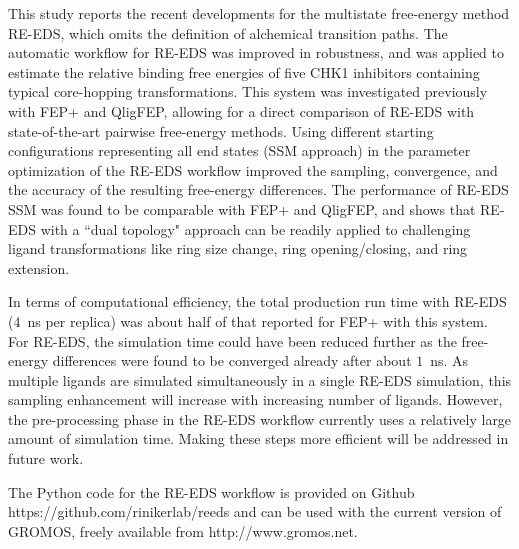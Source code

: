 This study reports the recent developments for the multistate free-energy method RE-EDS, which omits the definition of alchemical transition paths. The automatic workflow for RE-EDS was improved in robustness, and was applied to estimate the relative binding free energies of five CHK1 inhibitors containing typical core-hopping transformations. This system was investigated previously with FEP+ and QligFEP, allowing for a direct comparison of RE-EDS with state-of-the-art pairwise free-energy methods.
Using different starting configurations representing all end states (SSM approach) in the parameter optimization of the RE-EDS workflow improved the sampling, convergence, and the accuracy of the resulting free-energy differences. The performance of RE-EDS SSM was found to be comparable with FEP+ and QligFEP, and shows that RE-EDS with a ``dual topology" approach can be readily applied to challenging ligand transformations like ring size change, ring opening/closing, and ring extension.

In terms of computational efficiency, the total production run time with RE-EDS ($4$~ns per replica) was about half of that reported for FEP+ with this system. For RE-EDS, the simulation time could have been reduced further as the free-energy differences were found to be converged already after about $1$~ns. As multiple ligands are simulated simultaneously in a single RE-EDS simulation, this sampling enhancement will increase with increasing number of ligands. 
However, the pre-processing phase in the RE-EDS workflow currently uses a relatively large amount of simulation time. Making these steps more efficient will be addressed in future work.

The Python code for the RE-EDS workflow is provided on Github \\https://github.com/rinikerlab/reeds and can be used with the current version of GROMOS, freely available from http://www.gromos.net.